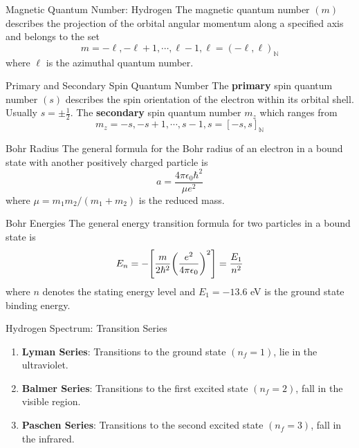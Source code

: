 \documentclass[avery5371,grid]{flashcards}
\begin{document}
\begin{flashcard}[Theory]{Magnetic Quantum Number: Hydrogen}
	The magnetic quantum number $(m)$ describes the projection of the orbital angular momentum along a specified axis and belongs to the set
	\begin{equation*}
		m = -\ell, -\ell+1,\cdots,\ell-1,\ell = (-\ell,\ell)_{\mathbb{N}}
	\end{equation*}
	where $\ell$ is the azimuthal quantum number.
\end{flashcard}

\begin{flashcard}[Theory]{Primary and Secondary Spin Quantum Number}
	The \textbf{primary} spin quantum number $(s)$ describes the spin orientation of the electron within its orbital shell. Usually $s = \pm \frac{1}{2}$. The \textbf{secondary} spin quantum number $m_z$ which ranges from
	\begin{equation*}
		m_z = -s, -s + 1, \cdots, s-1, s = [-s,s]_{\mathbb{N}}
	\end{equation*}
\end{flashcard}

\begin{flashcard}[Formula]{Bohr Radius}
	The general formula for the Bohr radius of an electron in a bound state with another positively charged particle is
	\begin{equation*}
		a = \frac{4\pi \epsilon_0\hbar^2}{\mu e^2}
	\end{equation*}
	where $\mu = m_1m_2/(m_1+m_2)$ is the reduced mass.
\end{flashcard}

\begin{flashcard}[Formula]{Bohr Energies}
	The general energy transition formula for two particles in a bound state is
	\begin{equation*}
		E_n = -\qty[\frac{m}{2\hbar^2}\qty(\frac{e^2}{4\pi \epsilon_0})^2]= \frac{E_1}{n^2}
	\end{equation*} 
	where $n$ denotes the stating energy level and $E_1=-13.6$ eV is the ground state binding energy.
\end{flashcard}

\begin{flashcard}[Theory]{Hydrogen Spectrum: Transition Series}
	\begin{enumerate}
		\item \textbf{Lyman Series}: Transitions to the ground state $(n_f=1)$, lie in the ultraviolet.
		\item \textbf{Balmer Series}: Transitions to the first excited state $(n_f=2)$, fall in the visible region.
		\item \textbf{Paschen Series}: Transitions to the second excited state $(n_f=3)$, fall in the infrared.
	\end{enumerate}
\end{flashcard}
\end{document}
